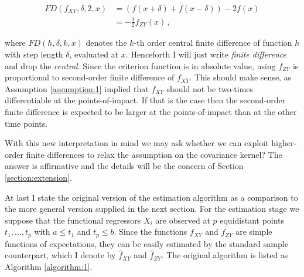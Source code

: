 \begin{align*}
    FD(f_{XY}, \delta, 2, x) &= \left( f(x + \delta) + f(x - \delta) \right) - 2 f(x)\\
                             &= - \frac{1}{2} f_{ZY}(x) \,,
\end{align*}

where $FD(h, \delta, k, x)$ denotes the $k$-th order central finite difference of
function $h$ with step length $\delta$, evaluated at $x$. Henceforth I will just write
\emph{finite difference} and drop the \emph{central}. Since the criterion function is in
absolute value, using $f_{ZY}$ is proportional to second-order finite difference of
$f_{XY}$. This should make sense, as Assumption \ref{assumption:1} implied that $f_{XY}$
should not be two-times differentiable at the points-of-impact. If that is the case then
the second-order finite difference is expected to be larger at the points-of-impact than
at the other time points.


With this new interpretation in mind we may ask whether we can exploit higher-order
finite differences to relax the assumption on the covariance kernel? The answer is
affirmative and the details will be the concern of Section \ref{section:extension}.


At last I state the original version of the estimation algorithm as a comparison to the
more general version supplied in the next section. For the estimation stage we suppose
that the functional regressors $X_i$ are observed at $p$ equidistant points $t_1, \dots,
t_p$ with $a \leq t_1$ and $t_p \leq b$. Since the functions $f_{XY}$ and $f_{ZY}$ are simple
functions of expectations, they can be easily estimated by the standard sample
counterpart, which I denote by $\hat{f}_{XY}$ and $\hat{f}_{ZY}$. The original algorithm
is listed as Algorithm \ref{algorithm:1}.


